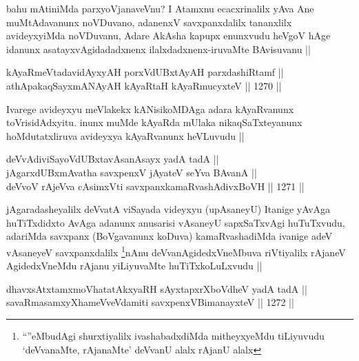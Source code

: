 \begin{artha}
bahu mAtiniMda parxyoVjanaveVnu? I Atamxnu ecacxrinalilx yAva Ane muMtAdavanunx noVDuvano, adanenxV savxpanxdalilx tananxlilx avideyxyiMda noVDuvanu, Adare AkAsha kapupx enunxvudu heVgoV hAge idanunx asatayxvAgidadadxnenx ilalxdadxnenx-iruvaMte BAvisuvanu ||
\end{artha}


\begin{shl}
kAyaRmeVtadavidAyxyAH porxVdUBxtAyAH parxdashiRtamf || \\
athApakaqSayxmANAyAH kAyaRtaH kAyaRmucyxteV ||  1270 ||  
\end{shl}

\begin{artha}
Ivarege avideyxyu meVlakekx kANisikoMDAga adara kAyaRvanunx toVrisidAdxyitu. inunx muMde kAyaRda mUlaka nikaqSaTxteyanunx hoMdutatxliruva avideyxya kAyaRvanunx heVLuvudu ||
\end{artha}


\begin{shl}
deVvAdiviSayoVdUBxtavAsanA\s sayx yadA tadA || \\
jAgarxdUBxmAvatha savxpenxV jAyateV seYva BAvanA || \\
deVvoV rAjeVva cAsimxVti savxpanxkamaRvashAdivxBoVH ||  1271 ||  
\end{shl}

\begin{artha}
jAgaradasheyalilx deVvatA viSayada videyxyu (upAsaneyU) Itanige yAvAga huTiTxdidxto AvAga adanunx anusarisi vAsaneyU sapxSaTxvAgi huTuTxvudu, adariMda savxpanx (BoVgavanunx koDuva) kamaRvashadiMda ivanige adeV vAsaneyeV savxpanxdalilx \footnote{``\stext''eMbudAgi shurxtiyalilx ivashabadxdiMda mitheyxyeMdu tiLiyuvudu `deVvanaMte, rAjanaMte' deVvanU alalx rAjanU alalx}nAnu deVvanAgidedxVneMbuva riVtiyalilx rAjaneV AgidedxVneMdu rAjanu yiLiyuvaMte huTiTxkoLuLxvudu ||
\end{artha}


\begin{shl}
dhavxsAtxtamxmoVhatatAkxyaRH sAyxtapxrXboVdheV yadA tadA || \\
savaRmasamxyXhameVveVdamiti savxpenxV\s BimanayxteV ||  1272 || 
\end{shl}

